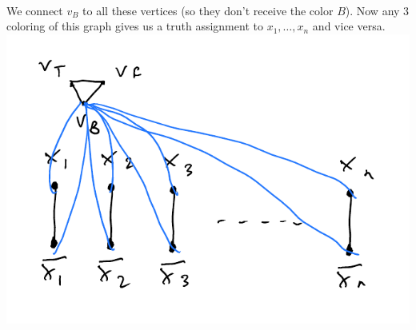 \documentclass[12 pt]{article}
\begin{document}
          \\We connect $v_B$ to all these vertices (so they don't
          receive the color $B$). Now any $3$ coloring of this graph
          gives us a truth assignment to $x_1, \ldots, x_n$ and vice
          versa.
          \\ \includegraphics[width=.9\textwidth]{i135.pdf}
\end{document}

